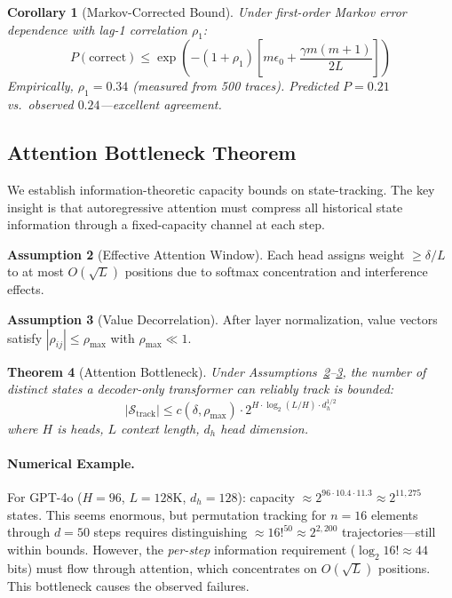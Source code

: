 \documentclass{article}
\theoremstyle{plain}
\newtheorem{theorem}{Theorem}[section]
\newtheorem{corollary}[theorem]{Corollary}
\theoremstyle{definition}
\newtheorem{assumption}[theorem]{Assumption}
\theoremstyle{remark}
\begin{document}
\begin{corollary}[Markov-Corrected Bound]
\label{cor:markov}
Under first-order Markov error dependence with lag-1 correlation $\rho_1$:
\begin{equation}
P(\text{correct}) \leq \exp\left(-(1+\rho_1)\left[m\epsilon_0 + \frac{\gamma m(m+1)}{2L}\right]\right)
\end{equation}
Empirically, $\rho_1 = 0.34$ (measured from 500 traces). Predicted $P = 0.21$ vs.\ observed $0.24$---excellent agreement.
\end{corollary}

\subsection{Attention Bottleneck Theorem}

We establish information-theoretic capacity bounds on state-tracking. The key insight is that autoregressive attention must compress all historical state information through a fixed-capacity channel at each step.

\begin{assumption}[Effective Attention Window]
\label{ass:window}
Each head assigns weight $\geq \delta/L$ to at most $O(\sqrt{L})$ positions due to softmax concentration and interference effects.
\end{assumption}

\begin{assumption}[Value Decorrelation]
\label{ass:decorr}
After layer normalization, value vectors satisfy $|\rho_{ij}| \leq \rho_{\max}$ with $\rho_{\max} \ll 1$.
\end{assumption}

\begin{theorem}[Attention Bottleneck]
\label{thm:bottleneck}
Under Assumptions~\ref{ass:window}--\ref{ass:decorr}, the number of distinct states a decoder-only transformer can reliably track is bounded:
\begin{equation}
|\mathcal{S}_{\text{track}}| \leq c(\delta, \rho_{\max}) \cdot 2^{H \cdot \log_2(L/H) \cdot d_h^{1/2}}
\end{equation}
where $H$ is heads, $L$ context length, $d_h$ head dimension.
\end{theorem}

\paragraph{Numerical Example.} For GPT-4o ($H=96$, $L=128$K, $d_h=128$): capacity $\approx 2^{96 \cdot 10.4 \cdot 11.3} \approx 2^{11,275}$ states. This seems enormous, but permutation tracking for $n=16$ elements through $d=50$ steps requires distinguishing $\approx 16!^{50} \approx 2^{2,200}$ trajectories---still within bounds. However, the \emph{per-step} information requirement ($\log_2 16! \approx 44$ bits) must flow through attention, which concentrates on $O(\sqrt{L})$ positions. This bottleneck causes the observed failures.
\end{document}
